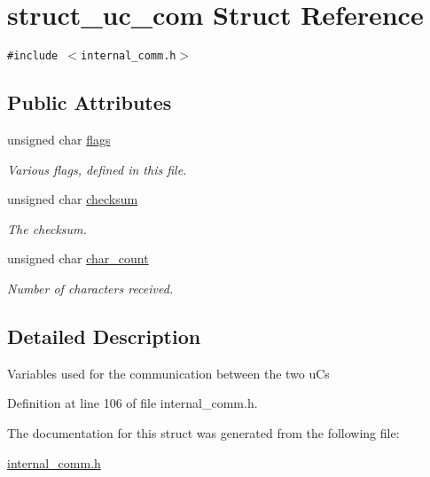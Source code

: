 \hypertarget{structstruct__uc__com}{
\section{struct\_\-uc\_\-com Struct Reference}
\label{structstruct__uc__com}
}
{\tt \#include $<$internal\_\-comm.h$>$}

\subsection*{Public Attributes}
\begin{CompactItemize}
\item 
\hypertarget{structstruct__uc__com_be75eb2b9ad7ce56b4ea77dbf00b7631}{
unsigned char \hyperlink{structstruct__uc__com_be75eb2b9ad7ce56b4ea77dbf00b7631}{flags}}
\label{structstruct__uc__com_be75eb2b9ad7ce56b4ea77dbf00b7631}

\begin{CompactList}\small\item\em Various flags, defined in this file. \item\end{CompactList}\item 
\hypertarget{structstruct__uc__com_c98401de20409540b2e427233b318467}{
unsigned char \hyperlink{structstruct__uc__com_c98401de20409540b2e427233b318467}{checksum}}
\label{structstruct__uc__com_c98401de20409540b2e427233b318467}

\begin{CompactList}\small\item\em The checksum. \item\end{CompactList}\item 
\hypertarget{structstruct__uc__com_09c10827873859613012cc9a0d26273f}{
unsigned char \hyperlink{structstruct__uc__com_09c10827873859613012cc9a0d26273f}{char\_\-count}}
\label{structstruct__uc__com_09c10827873859613012cc9a0d26273f}

\begin{CompactList}\small\item\em Number of characters received. \item\end{CompactList}\end{CompactItemize}


\subsection{Detailed Description}
Variables used for the communication between the two uCs 

Definition at line 106 of file internal\_\-comm.h.

The documentation for this struct was generated from the following file:\begin{CompactItemize}
\item 
\hyperlink{internal__comm_8h}{internal\_\-comm.h}\end{CompactItemize}
